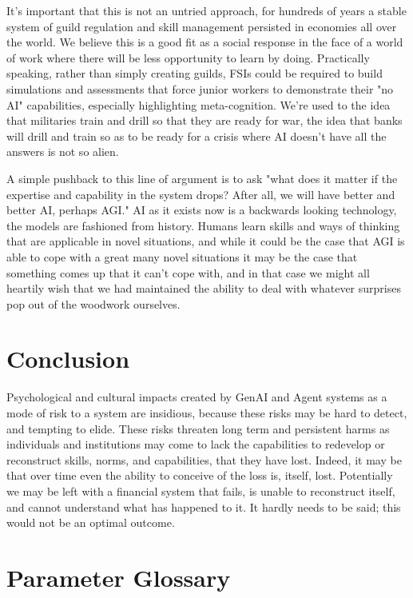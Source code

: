 \documentclass[11pt]{article}
\begin{document}
It's important that this is not an untried approach, for hundreds of years a stable system of guild regulation and skill management persisted in economies all over the world. We believe this is a good fit as a social response in the face of a world of work where there will be less opportunity to learn by doing. Practically speaking, rather than simply creating guilds,  FSIs could be required to build simulations and assessments that force junior workers to demonstrate their "no AI" capabilities, especially highlighting meta-cognition. We're used to the idea that militaries train and drill so that they are ready for war, the idea that banks will drill and train so as to be ready for a crisis where AI doesn't have all the answers is not so alien. 

A simple pushback to this line of argument is to ask "what does it matter if the expertise and capability in the system drops? After all, we will have better and better AI, perhaps AGI." AI as it exists now is a backwards looking technology, the models are fashioned from history. Humans learn skills and ways of thinking that are applicable in novel situations, and while it could be the case that AGI is able to cope with a great many novel situations it may be the case that something comes up that it can't cope with, and in that case we might all heartily wish that we had maintained the ability to deal with whatever surprises pop out of the woodwork ourselves. 

\section{Conclusion}

Psychological and cultural impacts created by GenAI and Agent systems as a mode of risk to a system are insidious, because these risks may be hard to detect, and tempting to elide. These risks threaten long term and persistent harms as individuals and institutions may come to lack the capabilities to redevelop or reconstruct skills, norms, and capabilities, that they have lost. Indeed, it may be that over time even the ability to conceive of the loss is, itself, lost. Potentially we may be left with a financial system that fails, is unable to reconstruct itself, and cannot understand what has happened to it.
It hardly needs to be said; this would not be an optimal outcome.





\section*{Parameter Glossary}
\end{document}
